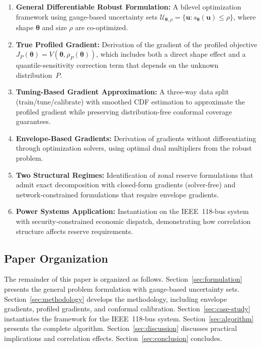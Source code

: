 \documentclass[lettersize,journal]{IEEEtran}
\newcommand{\cU}{\mathcal{U}}
\newcommand{\btheta}{\bm{\theta}}
\newcommand{\bu}{\bm{u}}
\theoremstyle{definition}
\begin{document}
\begin{enumerate}
\item \textbf{General Differentiable Robust Formulation:} A bilevel optimization framework using gauge-based uncertainty sets $\cU_{\btheta,\rho} = \{\bu : s_{\btheta}(\bu) \leq \rho\}$, where shape $\btheta$ and size $\rho$ are co-optimized.

\item \textbf{True Profiled Gradient:} Derivation of the gradient of the profiled objective $J_P(\btheta) = V(\btheta, \rho_P(\btheta))$, which includes both a direct shape effect and a quantile-sensitivity correction term that depends on the unknown distribution~$P$.

\item \textbf{Tuning-Based Gradient Approximation:} A three-way data split (train/tune/calibrate) with smoothed CDF estimation to approximate the profiled gradient while preserving distribution-free conformal coverage guarantees.

\item \textbf{Envelope-Based Gradients:} Derivation of gradients without differentiating through optimization solvers, using optimal dual multipliers from the robust problem.

\item \textbf{Two Structural Regimes:} Identification of zonal reserve formulations that admit exact decomposition with closed-form gradients (solver-free) and network-constrained formulations that require envelope gradients.

\item \textbf{Power Systems Application:} Instantiation on the IEEE~118-bus system with security-constrained economic dispatch, demonstrating how correlation structure affects reserve requirements.
\end{enumerate}

\subsection{Paper Organization}

The remainder of this paper is organized as follows. Section~\ref{sec:formulation} presents the general problem formulation with gauge-based uncertainty sets. Section~\ref{sec:methodology} develops the methodology, including envelope gradients, profiled gradients, and conformal calibration. Section~\ref{sec:case-study} instantiates the framework for the IEEE~118-bus system. Section~\ref{sec:algorithm} presents the complete algorithm. Section~\ref{sec:discussion} discusses practical implications and correlation effects. Section~\ref{sec:conclusion} concludes.
\end{document}
